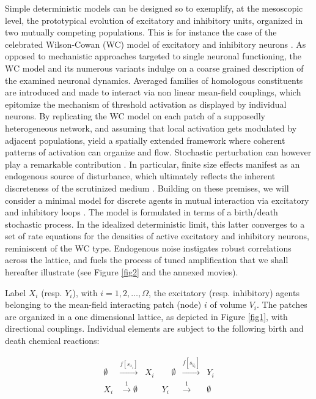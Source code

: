 \documentclass[showpacs,prl,superscriptaddress,nofootinbib, twocolumn]{revtex4}
\begin{document}
Simple deterministic models can be designed so to exemplify, at the mesoscopic level, the prototypical evolution of excitatory and inhibitory units, 
organized in two mutually competing populations. This is for instance the case of the celebrated Wilson-Cowan (WC) model of excitatory and inhibitory 
neurons \cite{WC1,WC2}. As opposed to mechanistic approaches targeted to single neuronal functioning, the WC model and its numerous variants indulge on a coarse grained description of the examined neuronal dynamics. 
Averaged families of homologous constituents are introduced and made to interact via non linear mean-field couplings, which epitomize the mechanism of 
threshold activation as displayed by individual neurons. By replicating the WC model on each patch of a supposedly heterogeneous network, and assuming that local activation gets modulated 
by adjacent populations, yield a spatially extended framework where coherent patterns of activation can organize and flow. Stochastic perturbation can however play a remarkable contribution \cite{Goychuck, Negahbani, Cowan2016, Wallace2011}. In particular, finite size effects manifest as an endogenous source of disturbance, which ultimately reflects the inherent discreteness of the scrutinized medium \cite{bressloff,vankampen,mckanenewman,bartlett}.  Building on these premises,  we will consider a minimal model for discrete agents in mutual interaction via excitatory and inhibitory loops \cite{Zankoc}. The model is formulated in terms of a birth/death stochastic process. In the idealized deterministic limit, this latter converges to a set of rate equations for the densities of active excitatory and inhibitory neurons, reminiscent of the WC type.  Endogenous noise instigates robust correlations across the lattice, and fuels the process of tuned amplification that we shall hereafter illustrate (see Figure \ref{fig2} and the annexed movies). 

Label $X_i$  (resp. $Y_i$), with $i\!=\!1,2,\ldots,\Omega$, the excitatory (resp. inhibitory) agents belonging to the mean-field interacting
patch (node) $i$ of volume $V_i$. The patches are organized in a one dimensional lattice, as depicted in Figure \ref{fig1}, with directional couplings. 
Individual elements are subject to the following birth and death chemical reactions: 

\begin{equation*}
\begin{array}{lclcl}
\emptyset & \overset{f[s_{x_i}]}{\longrightarrow} & X_i \qquad  \emptyset & \overset{f[s_{y_i}]}{\longrightarrow} & Y_i \\
X_i & \overset{1}{\longrightarrow} \emptyset  & \qquad Y_i & \overset{1}{\longrightarrow} & \emptyset \nonumber
\end{array}
\label{chemical}
\end{equation*}
\end{document}
